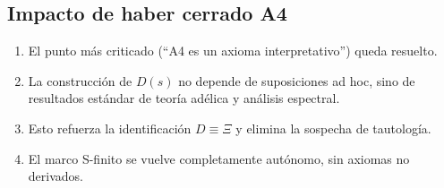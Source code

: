 \subsection*{Impacto de haber cerrado A4}

\begin{enumerate}
\item El punto más criticado (``A4 es un axioma interpretativo'') queda resuelto.

\item La construcción de $D(s)$ no depende de suposiciones ad hoc, sino de resultados estándar de teoría adélica y análisis espectral.

\item Esto refuerza la identificación $D \equiv \Xi$ y elimina la sospecha de tautología.

\item El marco S-finito se vuelve completamente autónomo, sin axiomas no derivados.
\end{enumerate}
